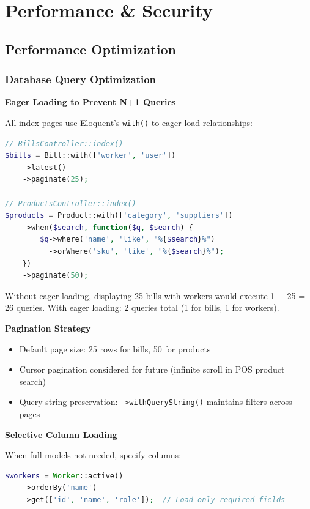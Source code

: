 \section{Performance \& Security}

\subsection{Performance Optimization}

\subsubsection{Database Query Optimization}

\textbf{Eager Loading to Prevent N+1 Queries}

All index pages use Eloquent's \texttt{with()} to eager load relationships:

\begin{lstlisting}[language=PHP,label=lst:eager-loading]
// BillsController::index()
$bills = Bill::with(['worker', 'user'])
    ->latest()
    ->paginate(25);

// ProductsController::index()
$products = Product::with(['category', 'suppliers'])
    ->when($search, function($q, $search) {
        $q->where('name', 'like', "%{$search}%")
          ->orWhere('sku', 'like', "%{$search}%");
    })
    ->paginate(50);
\end{lstlisting}

Without eager loading, displaying 25 bills with workers would execute 1 + 25 = 26 queries. With eager loading: 2 queries total (1 for bills, 1 for workers).

\textbf{Pagination Strategy}

\begin{itemize}
    \item Default page size: 25 rows for bills, 50 for products
    \item Cursor pagination considered for future (infinite scroll in POS product search)
    \item Query string preservation: \texttt{->withQueryString()} maintains filters across pages
\end{itemize}

\textbf{Selective Column Loading}

When full models not needed, specify columns:

\begin{lstlisting}[language=PHP]
$workers = Worker::active()
    ->orderBy('name')
    ->get(['id', 'name', 'role']);  // Load only required fields
\end{lstlisting}


